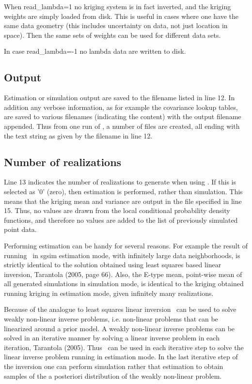 \documentclass[12t]{article}
\begin{document}
When read\_lambda=1 no kriging system is in fact inverted, and the kriging weights are simply loaded from disk. This is useful in cases where one have the same data geometry (this includes uncertainty on data, not just location in space). Then the same sets of weights can be used for different data sets.

In case read\_lambda=-1 no lambda data are written to disk.


\subsection{Output}
Estimation or simulation output are saved to the filename listed in line 12. In addition any verbose information, as for example the covariance lookup tables, are saved to various filenames (indicating the content) with the output filename appended. Thus from one run of \visimprog, a number of files are created, all ending with the text string as given by the filename in line 12.

\subsection{Number of realizations}
Line 13 indicates the number of realizations to generate when using \visimprog. If this is selected as '0' (zero), then estimation is performed, rather than simulation. This means that the kriging mean and variance are output in the file specified in line 15. Thus, no values are drawn from the local conditional probability density functions, and therefore no values are added to the list of previously simulated point data.

Performing estimation can be handy for several reasons. For example
the result of running
\visimprog~in sgsim estimation mode, with infinitely large data
neighborhoods, is strictly identical to the 
solution obtained using least squares based linear inversion, Tarantola (2005, page 66).
Also, the E-type mean, point-wise mean of all generated simulations in
simulation mode,
is identical to the kriging obtained running kriging in estimation
mode, given infinitely many realizations. 

Because of the analogue to least squares linear inversion
\visimprog~can be used to solve weakly non-linear inverse problems,
i.e. non-linear problems that can be linearized around a prior model.
A weakly non-linear inverse problems can be solved in an iterative
manner by solving a linear inverse problem in each iteration, Tarantola (2005).
Thus \visimprog~can be used in each iterative step to solve the linear
inverse problem running in estimation mode.
In the last iterative step of the inversion one can perform simulation
rather that estimation to obtain samples of the a posteriori
distribution of the weakly non-linear problem.
\end{document}
